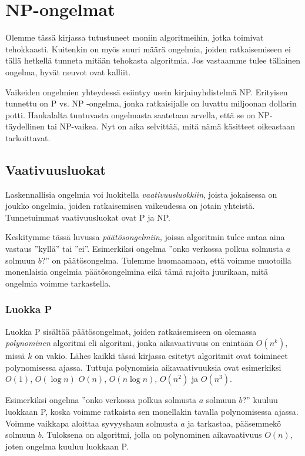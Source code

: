 \chapter{NP-ongelmat}

Olemme tässä kirjassa tutustuneet moniin algoritmeihin,
jotka toimivat tehokkaasti.
Kuitenkin on myös suuri määrä ongelmia, joiden ratkaisemiseen ei tällä
hetkellä tunneta mitään tehokasta algoritmia.
Jos vastaamme tulee tällainen ongelma, hyvät neuvot ovat kalliit.

Vaikeiden ongelmien yhteydessä esiintyy usein kirjainyhdistelmä NP.
Erityisen tunnettu on P vs. NP -ongelma,
jonka ratkaisijalle on luvattu miljoonan dollarin potti.
Hankalalta tuntuvasta ongelmasta saatetaan arvella, että
se on NP-täydellinen tai NP-vaikea.
Nyt on aika selvittää, mitä nämä käsitteet oikeastaan tarkoittavat.

\section{Vaativuusluokat}

Laskennallisia ongelmia voi luokitella \emph{vaativuusluokkiin},
joista jokaisessa on joukko ongelmia,
joiden ratkaisemisen vaikeudessa on jotain yhteistä.
Tunnetuimmat vaativuusluokat ovat P ja NP.

Keskitymme tässä luvussa \emph{päätösongelmiin}, joissa algoritmin tulee
antaa aina vastaus ''kyllä'' tai ''ei''.
Esimerkiksi ongelma 
''onko verkossa polkua solmusta $a$ solmuun $b$?'' on päätösongelma.
Tulemme huomaamaan, että voimme muotoilla monenlaisia ongelmia
päätösongelmina eikä tämä rajoita juurikaan, mitä ongelmia voimme tarkastella.

\subsection{Luokka P}

Luokka P sisältää päätösongelmat, joiden ratkaisemiseen on
olemassa \emph{polynominen} algoritmi eli algoritmi, jonka aikavaativuus
on enintään $O(n^k)$, missä $k$ on vakio.
Lähes kaikki tässä kirjassa esitetyt algoritmit
ovat toimineet polynomisessa ajassa.
Tuttuja polynomisia aikavaativuuksia ovat esimerkiksi
$O(1)$, $O(\log n)$ $O(n)$, $O(n \log n)$, $O(n^2)$ ja $O(n^3)$.

Esimerkiksi ongelma ''onko verkossa polkua solmusta $a$ solmuun $b$?''
kuuluu luokkaan P, koska voimme ratkaista sen monellakin tavalla
polynomisessa ajassa.
Voimme vaikkapa aloittaa syvyyshaun solmusta $a$ ja tarkastaa,
pääsemmekö solmuun $b$.
Tuloksena on algoritmi, jolla on polynominen aikavaativuus
$O(n)$, joten ongelma kuuluu luokkaan P.

